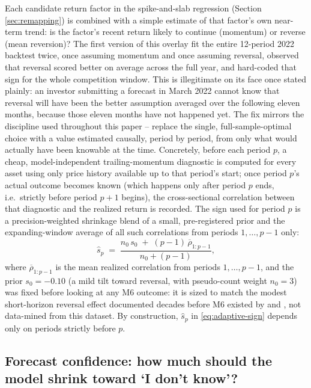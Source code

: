 \documentclass[11pt]{article}
\begin{document}
Each candidate return factor in the spike-and-slab regression (Section
\ref{sec:remapping}) is combined with a simple estimate of that factor's own
near-term trend: is the factor's recent return likely to continue (momentum)
or reverse (mean reversion)? The first version of this overlay fit the entire
12-period 2022 backtest twice, once assuming momentum and once assuming
reversal, observed that reversal scored better on average across the full
year, and hard-coded that sign for the whole competition window. This is
illegitimate on its face once stated plainly: an investor submitting a
forecast in March 2022 cannot know that reversal will have been the better
assumption averaged over the following eleven months, because those eleven
months have not happened yet. The fix mirrors the discipline used throughout
this paper -- replace the single, full-sample-optimal choice with a value
estimated causally, period by period, from only what would actually have been
knowable at the time. Concretely, before each period $p$, a cheap,
model-independent trailing-momentum diagnostic is computed for every asset
using only price history available up to that period's start; once period
$p$'s actual outcome becomes known (which happens only after period $p$ ends,
i.e.\ strictly before period $p+1$ begins), the cross-sectional correlation
between that diagnostic and the realized return is recorded. The sign used for
period $p$ is a precision-weighted shrinkage blend of a small, pre-registered
prior and the expanding-window average of all such correlations from periods
$1,\dots,p-1$ only:
\begin{equation}
\hat{s}_p \;=\; \frac{n_0 \, s_0 \;+\; (p-1)\,\overline{\rho}_{1:p-1}}{n_0 + (p-1)},
\label{eq:adaptive-sign}
\end{equation}
where $\overline{\rho}_{1:p-1}$ is the mean realized correlation from periods
$1,\dots,p-1$, and the prior $s_0=-0.10$ (a mild tilt toward reversal, with
pseudo-count weight $n_0=3$) was fixed before looking at any M6 outcome: it is
sized to match the modest short-horizon reversal effect documented decades
before M6 existed by \citet{jegadeesh1990} and \citet{lehmann1990}, not
data-mined from this dataset. By construction, $\hat{s}_p$ in
\eqref{eq:adaptive-sign} depends only on periods strictly before $p$.

\subsection{Forecast confidence: how much should the model shrink toward `I don't know'?}
\label{sec:shrinkage}
\end{document}
